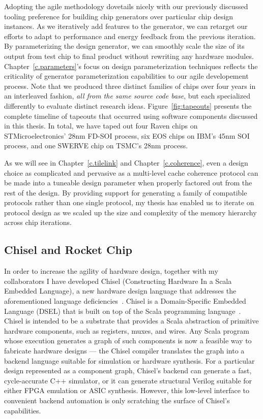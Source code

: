 Adopting the agile methodology dovetails nicely with our previously discussed tooling preference for building chip generators over particular chip design instances.
As we iteratively add features to the generator, we can retarget our efforts to adapt to performance and energy feedback from the previous iteration.
By parameterizing the design generator, we can smoothly scale the size of its output from test chip to final product without rewriting any hardware modules.
Chapter~\ref{c.parameters}'s focus on design parameterization techniques reflects the criticality of generator parameterization capabilities to our agile developement process.
Note that we produced three distinct families of chips over four years in an interleaved fashion, {\em all from the same source code base}, but each specialized differently to evaluate distinct research ideas.
Figure~\ref{fig:tapeouts} presents the complete timeline of tapeouts that occurred using software components discussed in this thesis.
In total, we have taped out four Raven chips on STMicroelectronics' 28nm FD-SOI process, six EOS chips on IBM's 45nm SOI process, and one SWERVE chip on TSMC's 28nm process.

As we will see in Chapter~\ref{c.tilelink} and Chapter~\ref{c.coherence}, even a design choice as complicated and pervasive as a multi-level cache coherence protocol can be made
into a tuneable design parameter when properly factored out from the rest of the design.
By providing support for generating a family of compatible protocols rather than one single protocol, my thesis has enabled us to iterate on protocol design as we scaled up the size and complexity of the memory hierarchy across chip iterations.

\subsection{Chisel and Rocket Chip}

In order to increase the agility of hardware design,
together with my collaborators I have developed Chisel (Constructing Hardware In a Scala Embedded Language), a new hardware design language that addresses the aforementioned language deficiencies~\cite{chisel}.
Chisel is a Domain-Specific Embedded Language (DSEL) that is built on top of the Scala programming language~\cite{scala}.
Chisel is intended to be a substrate that provides a Scala abstraction of primitive hardware components, such as registers, muxes, and wires.
Any Scala program whose execution generates a graph of such components is now a feasible way to fabricate hardware designs --- the Chisel compiler translates the graph into a backend language suitable for simulation or hardware synthesis.
For a particular design represented as a component graph, Chisel's backend can generate a fast, cycle-accurate C++ simulator, or it can generate structural Verilog suitable for either FPGA emulation or ASIC synthesis.
However, this low-level interface to convenient backend automation is only scratching the surface of Chisel's capabilities.

